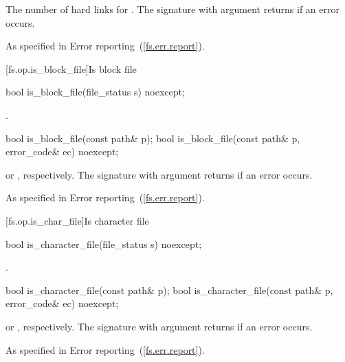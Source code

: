 \begin{itemdescr}
\pnum
\returns The number of hard links for . The signature
  with argument  returns 
  if an error occurs.

\pnum
\throws As specified in Error reporting~(\ref{fs.err.report}).
\end{itemdescr}


[fs.op.is_block_file]{Is block file}

\begin{itemdecl}
bool is_block_file(file_status s) noexcept;
\end{itemdecl}

\begin{itemdescr}
\pnum
\returns {}.
\end{itemdescr}

\begin{itemdecl}
bool is_block_file(const path& p);
bool is_block_file(const path& p, error_code& ec) noexcept;
\end{itemdecl}

\begin{itemdescr}
\pnum
\returns {} or , respectively.
The signature with argument  returns  if an error occurs.

\pnum
\throws As specified in Error reporting~(\ref{fs.err.report}).
\end{itemdescr}


[fs.op.is_char_file]{Is character file}

\begin{itemdecl}
bool is_character_file(file_status s) noexcept;
\end{itemdecl}

\begin{itemdescr}
\pnum
\returns {}.
\end{itemdescr}

\begin{itemdecl}
bool is_character_file(const path& p);
bool is_character_file(const path& p, error_code& ec) noexcept;
\end{itemdecl}

\begin{itemdescr}
\pnum
\returns {}
  or ,
  respectively. The signature with argument  returns 
  if an error occurs.

\pnum
\throws As specified in Error reporting~(\ref{fs.err.report}).
\end{itemdescr}


